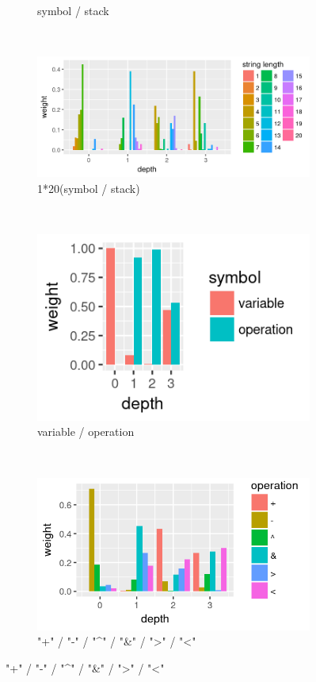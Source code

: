 \begin{figure}
\begin{subfigure}{0.48\textwidth}
        \caption{symbol / stack}
        \label{fig:sa-dist-stack}
    \end{subfigure}
    \\
    \begin{subfigure}{0.98\textwidth}
        \includegraphics[width=\textwidth]{figures/sa-dist-strlen}
        \caption{1*20(symbol / stack)}
        \label{fig:sa-dist-strlen}
    \end{subfigure}
    \\
    \begin{subfigure}{0.4\textwidth}
        \includegraphics[width=\textwidth]{figures/sa-dist-sym}
        \caption{variable / operation}
        \label{fig:sa-dist-sym}
    \end{subfigure}
    ~
    \begin{subfigure}{0.57\textwidth}
        \includegraphics[width=\textwidth]{figures/sa-dist-op}
        \caption{"+" / "-" / "\textasciicircum" / "\&" / ">" / "<"}
        \label{fig:sa-dist-op}
    \end{subfigure}
\end{figure}
